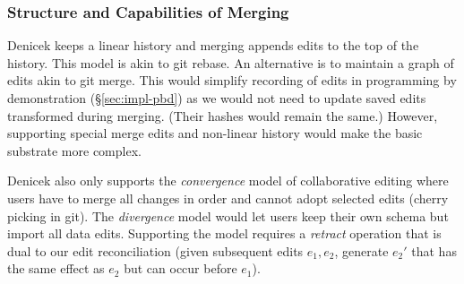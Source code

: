 \documentclass[sigconf,anonymous,screen]{acmart}
\newcommand{\ident}[1]{{\sffamily #1}}
\newcommand{\note}[1]{\textcolor{red}{#1}}
\begin{document}
%
%


\subsubsection*{Structure and Capabilities of Merging}
Denicek keeps a linear history and merging appends edits to the top of the history.
This model is akin to git rebase. An alternative is to maintain a graph of edits akin
to git merge. This would simplify recording of edits in programming by demonstration
(\S\ref{sec:impl-pbd}) as we would not need to update saved edits transformed
during merging. (Their hashes would remain the same.) However, supporting special
merge edits and non-linear history would make the basic substrate more complex.

Denicek also only supports the \emph{convergence} model of collaborative editing \cite{edwards-2025-schema}
where users have to merge all changes in order and cannot adopt selected edits (cherry
picking in git). The \emph{divergence} model would let users keep their own schema but
import all data edits. Supporting the model requires a \emph{retract} operation \cite{edwards-2021-typed}
that is dual to our edit reconciliation (given subsequent edits $e_1, e_2$, generate
$e_2'$ that has the same effect as $e_2$ but can occur before $e_1$).
\end{document}

